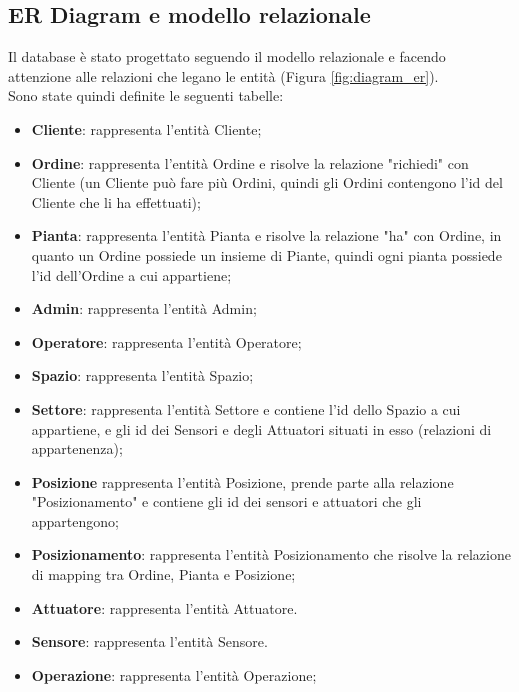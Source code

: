 \documentclass{article}
\begin{document}
\subsection{ER Diagram e modello relazionale}
Il database è stato progettato seguendo il modello relazionale e facendo attenzione alle relazioni che legano le entità (Figura \ref{fig:diagram_er}).\\
Sono state quindi definite le seguenti tabelle:
\begin{itemize}
    \item \textbf{Cliente}: rappresenta l'entità Cliente;
    \item \textbf{Ordine}: rappresenta l’entità Ordine e risolve la relazione "richiedi" con Cliente (un Cliente può fare più Ordini, quindi gli Ordini contengono l'id del Cliente che li ha effettuati);
    \item \textbf{Pianta}: rappresenta l’entità Pianta e risolve la relazione "ha" con Ordine, in quanto un Ordine possiede un insieme di Piante, quindi ogni pianta possiede l'id dell'Ordine a cui appartiene;
    \item \textbf{Admin}: rappresenta l’entità Admin;
    \item \textbf{Operatore}: rappresenta l’entità Operatore;
    \item \textbf{Spazio}: rappresenta l’entità Spazio;
    \item \textbf{Settore}: rappresenta l’entità Settore e contiene l'id dello Spazio a cui appartiene, e gli id dei Sensori e degli Attuatori situati in esso (relazioni di appartenenza);
    \item \textbf{Posizione} rappresenta l’entità Posizione, prende parte alla relazione "Posizionamento" e contiene gli id dei sensori e attuatori che gli appartengono;
    \item \textbf{Posizionamento}: rappresenta l’entità Posizionamento che risolve la relazione di mapping tra Ordine, Pianta e Posizione;
    \item \textbf{Attuatore}: rappresenta l’entità Attuatore.
    \item \textbf{Sensore}: rappresenta l’entità Sensore.
    \item \textbf{Operazione}: rappresenta l’entità Operazione;
\end{itemize}
\end{document}
